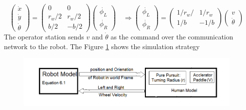 \begin{equation}
\begin{pmatrix}
\dot{x}\\
\dot{y}\\
\dot{\theta}
\end{pmatrix}
=
\begin{pmatrix}
0 & 0 \\
r_w/2 & r_w/2 \\
b/2 & -b/2
\end{pmatrix}
\begin{pmatrix}
\dot{\phi_L}\\
\dot{\phi_R}
\end{pmatrix}
\quad \Rightarrow 
\begin{pmatrix}
\dot{\phi_L}\\
\dot{\phi_R}
\end{pmatrix} =
\begin{pmatrix}
1/r_w/ & 1/r_w \\
1/b & -1/b
\end{pmatrix}
\begin{pmatrix}
v\\
\dot{\theta}
\end{pmatrix}
\end{equation}
The operator station  sends $v$ and $\dot{\theta}$ as the command over the  communication network to the robot. The Figure \ref{fig:SimBlock1} shows the simulation strategy 
\begin{figure}[h]
	\includegraphics[width=\linewidth,keepaspectratio]{Chapter6/fig/SimulationModel}
	\label{fig:SimBlock1} 
\end{figure}
  


